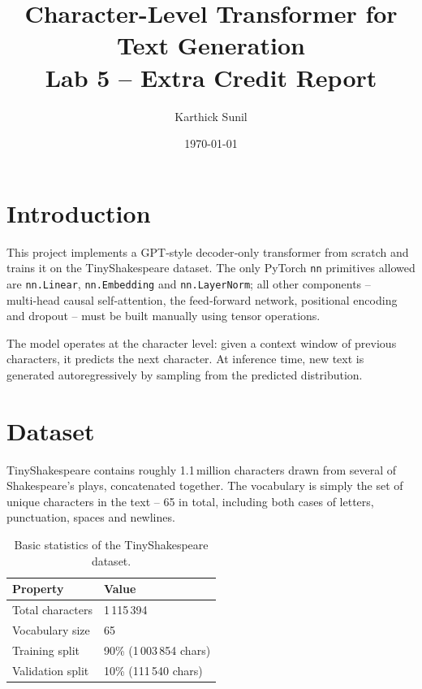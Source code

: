 \documentclass[12pt, a4paper]{article}
\title{
  \textbf{Character-Level Transformer for Text Generation} \\[0.4em]
  \large Lab 5 – Extra Credit Report
}
\author{Karthick Sunil}
\date{\today}
\begin{document}
\maketitle
\tableofcontents
\newpage

\section{Introduction}

This project implements a GPT‑style decoder‑only transformer from scratch and trains it on the TinyShakespeare dataset. The only PyTorch \texttt{nn} primitives allowed are \texttt{nn.Linear}, \texttt{nn.Embedding} and \texttt{nn.LayerNorm}; all other components – multi‑head causal self‑attention, the feed‑forward network, positional encoding and dropout – must be built manually using tensor operations.

The model operates at the character level: given a context window of previous characters, it predicts the next character. At inference time, new text is generated autoregressively by sampling from the predicted distribution.

\section{Dataset}

TinyShakespeare contains roughly 1.1 million characters drawn from several of Shakespeare’s plays, concatenated together. The vocabulary is simply the set of unique characters in the text – 65 in total, including both cases of letters, punctuation, spaces and newlines.

\begin{table}[H]
  \centering
  \begin{tabular}{ll}
    \toprule
    \textbf{Property} & \textbf{Value} \\
    \midrule
    Total characters  & 1 115 394 \\
    Vocabulary size   & 65 \\
    Training split    & 90\% (1 003 854 chars) \\
    Validation split  & 10\% (111 540 chars) \\
    \bottomrule
  \end{tabular}
  \caption{Basic statistics of the TinyShakespeare dataset.}
\end{table}
\end{document}
